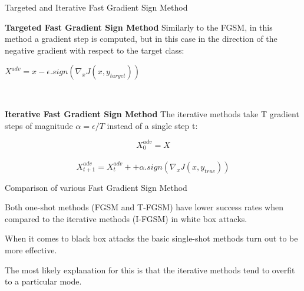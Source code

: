 \documentclass[10pt]{beamer}
\begin{document}
\begin{frame}{Targeted and Iterative Fast Gradient Sign Method}
        
        \textbf{Targeted Fast Gradient Sign Method}
        Similarly to the FGSM, in this method a gradient step is computed, but in this case in the direction of the negative gradient with respect to the target class:\\\bigskip
        
        \centerline{$X^{adv} = x - \epsilon . sign(\nabla_{x}J(x, y_{target}))$}\\\bigskip
        
        
        \textbf{Iterative Fast Gradient Sign Method}
        The iterative methods take T gradient steps of magnitude 
        $ \alpha = \epsilon / T $ instead of a single step t:
        
        {$$X^{adv}_{0} = X$$}\\
        {$$X^{adv}_{t+1} = X^{adv}_{t} + + \alpha . sign(\nabla_{x}J(x, y_{true}))$$}
        
\end{frame}

\begin{frame}{Comparison of various Fast Gradient Sign Method}
        
        Both one-shot methods (FGSM and T-FGSM) have lower success rates when compared to the iterative methods (I-FGSM) in white box attacks.\\\bigskip
        
        When it comes to black box attacks the basic single-shot methods turn out to be more effective.\\\bigskip
        
        The most likely explanation for this is that the iterative methods tend to overfit to a particular mode.
        
    \end{frame}
\end{document}
